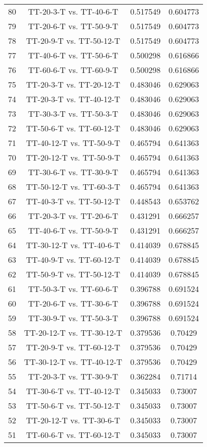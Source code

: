 \documentclass[a4paper,10pt]{article}
\begin{document}
\begin{landscape}
\begin{table}[!htp]
\begin{tabular}{cccc}
80&TT-20-3-T vs. TT-40-6-T&0.517549&0.604773\\
79&TT-20-6-T vs. TT-50-9-T&0.517549&0.604773\\
78&TT-20-9-T vs. TT-50-12-T&0.517549&0.604773\\
77&TT-40-6-T vs. TT-50-6-T&0.500298&0.616866\\
76&TT-60-6-T vs. TT-60-9-T&0.500298&0.616866\\
75&TT-20-3-T vs. TT-20-12-T&0.483046&0.629063\\
74&TT-20-3-T vs. TT-40-12-T&0.483046&0.629063\\
73&TT-30-3-T vs. TT-50-3-T&0.483046&0.629063\\
72&TT-50-6-T vs. TT-60-12-T&0.483046&0.629063\\
71&TT-40-12-T vs. TT-50-9-T&0.465794&0.641363\\
70&TT-20-12-T vs. TT-50-9-T&0.465794&0.641363\\
69&TT-30-6-T vs. TT-30-9-T&0.465794&0.641363\\
68&TT-50-12-T vs. TT-60-3-T&0.465794&0.641363\\
67&TT-40-3-T vs. TT-50-12-T&0.448543&0.653762\\
66&TT-20-3-T vs. TT-20-6-T&0.431291&0.666257\\
65&TT-40-6-T vs. TT-50-9-T&0.431291&0.666257\\
64&TT-30-12-T vs. TT-40-6-T&0.414039&0.678845\\
63&TT-40-9-T vs. TT-60-12-T&0.414039&0.678845\\
62&TT-50-9-T vs. TT-50-12-T&0.414039&0.678845\\
61&TT-50-3-T vs. TT-60-6-T&0.396788&0.691524\\
60&TT-20-6-T vs. TT-30-6-T&0.396788&0.691524\\
59&TT-30-9-T vs. TT-50-3-T&0.396788&0.691524\\
58&TT-20-12-T vs. TT-30-12-T&0.379536&0.70429\\
57&TT-20-9-T vs. TT-60-12-T&0.379536&0.70429\\
56&TT-30-12-T vs. TT-40-12-T&0.379536&0.70429\\
55&TT-20-3-T vs. TT-30-9-T&0.362284&0.71714\\
54&TT-30-6-T vs. TT-40-12-T&0.345033&0.73007\\
53&TT-50-6-T vs. TT-50-12-T&0.345033&0.73007\\
52&TT-20-12-T vs. TT-30-6-T&0.345033&0.73007\\
51&TT-60-6-T vs. TT-60-12-T&0.345033&0.73007\\

\end{tabular}
\end{table}
\end{landscape}
\end{document}

